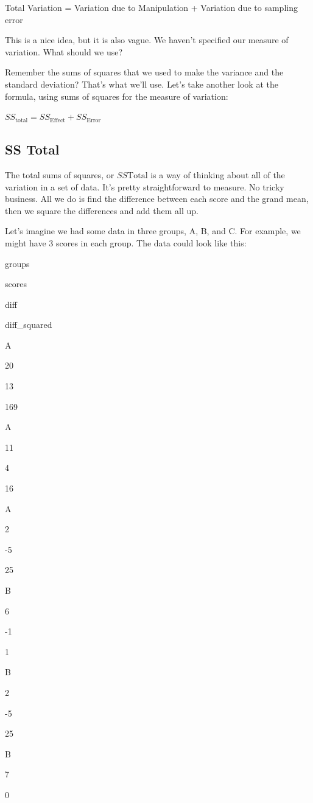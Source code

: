 \documentclass[
]{book}
\begin{document}
Total Variation = Variation due to Manipulation + Variation due to sampling error

This is a nice idea, but it is also vague. We haven't specified our measure of variation. What should we use?

Remember the sums of squares that we used to make the variance and the standard deviation? That's what we'll use. Let's take another look at the formula, using sums of squares for the measure of variation:

\(SS_\text{total} = SS_\text{Effect} + SS_\text{Error}\)

\hypertarget{ss-total}{%
\subsection{SS Total}\label{ss-total}}

The total sums of squares, or \(SS\text{Total}\) is a way of thinking about all of the variation in a set of data. It's pretty straightforward to measure. No tricky business. All we do is find the difference between each score and the grand mean, then we square the differences and add them all up.

Let's imagine we had some data in three groups, A, B, and C. For example, we might have 3 scores in each group. The data could look like this:

groups

scores

diff

diff\_squared

A

20

13

169

A

11

4

16

A

2

-5

25

B

6

-1

1

B

2

-5

25

B

7

0
\end{document}
